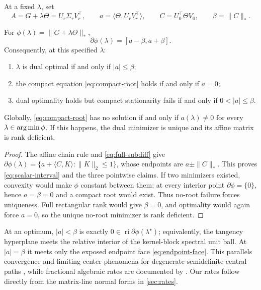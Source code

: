 At a fixed \(\lambda\), set
\begin{equation}
 A=G+\lambda\Theta=U_r\Sigma_rV_r^\top,
 \qquad
 a=\langle\Theta,U_rV_r^\top\rangle,
 \qquad
 C=U_0^\top\Theta V_0,
 \qquad
 \beta=\|C\|_*.
 \label{eq:a-C-beta-main}
\end{equation}

\begin{theorem}
\label{thm:interval}
For \(\phi(\lambda)=\|G+\lambda\Theta\|_*\),
\begin{equation}
 \partial\phi(\lambda)=[a-\beta,a+\beta].
 \label{eq:scalar-interval}
\end{equation}
Consequently, at this specified \(\lambda\):
\begin{enumerate}
 \item \(\lambda\) is dual optimal if and only if \(|a|\le\beta\);
 \item the compact equation \eqref{eq:compact-root} holds if and only if
 \(a=0\);
 \item dual optimality holds but compact stationarity fails if and only if
 \(0<|a|\le\beta\).
\end{enumerate}
Globally, \eqref{eq:compact-root} has no solution if and only if
\(a(\lambda)\ne0\) for every \(\lambda\in\operatorname*{arg\,min}\phi\).  If this happens,
the dual minimizer is unique and its affine matrix is rank deficient.
\end{theorem}

\begin{proof}
The affine chain rule and \eqref{eq:full-subdiff} give
\(\partial\phi(\lambda)=\{a+\langle C,K\rangle:\|K\|_2\le1\}\), whose
endpoints are \(a\pm\|C\|_*\).  This proves
\eqref{eq:scalar-interval} and the three pointwise claims.  If two minimizers
existed, convexity would make \(\phi\) constant between them; at every
interior point \(\partial\phi=\{0\}\), hence \(a=\beta=0\) and a compact root
would exist.  Thus no-root failure forces uniqueness.  Full rectangular rank
would give \(\beta=0\), and optimality would again force \(a=0\), so the
unique no-root minimizer is rank deficient.
\end{proof}

\begin{remark}
\label{rem:strict-complementarity-main}
At an optimum, \(|a|<\beta\) is exactly
\(0\in\operatorname{ri}\partial\phi(\lambda^\star)\); equivalently, the
tangency hyperplane meets the relative interior of the kernel-block spectral
unit ball.  At \(|a|=\beta\) it meets only the exposed endpoint face
\eqref{eq:endpoint-face}.  This parallels convergence and limiting-center
phenomena for degenerate semidefinite central paths
\citep{halicka2002convergence,halicka2005limiting}, while fractional algebraic
rates are documented by \citet{basu2022central}.  Our rates follow directly
from the matrix-line normal forms in \cref{sec:rates}.
\end{remark}

